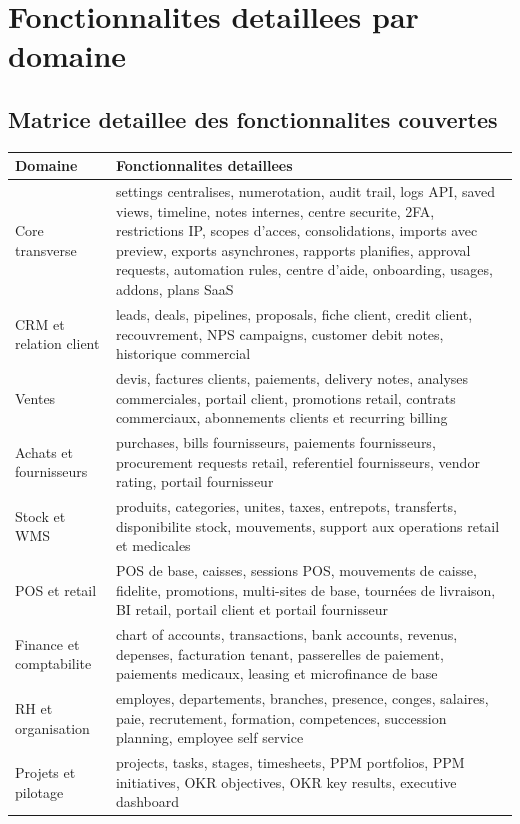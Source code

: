 \documentclass[11pt,a4paper]{article}
\begin{document}
\section{Fonctionnalites detaillees par domaine}
\subsection{Matrice detaillee des fonctionnalites couvertes}
\begin{longtable}{p{3.6cm}p{9.8cm}}
\toprule
\textbf{Domaine} & \textbf{Fonctionnalites detaillees} \\
\midrule
Core transverse & settings centralises, numerotation, audit trail, logs API, saved views, timeline, notes internes, centre securite, 2FA, restrictions IP, scopes d'acces, consolidations, imports avec preview, exports asynchrones, rapports planifies, approval requests, automation rules, centre d'aide, onboarding, usages, addons, plans SaaS \\
CRM et relation client & leads, deals, pipelines, proposals, fiche client, credit client, recouvrement, NPS campaigns, customer debit notes, historique commercial \\
Ventes & devis, factures clients, paiements, delivery notes, analyses commerciales, portail client, promotions retail, contrats commerciaux, abonnements clients et recurring billing \\
Achats et fournisseurs & purchases, bills fournisseurs, paiements fournisseurs, procurement requests retail, referentiel fournisseurs, vendor rating, portail fournisseur \\
Stock et WMS & produits, categories, unites, taxes, entrepots, transferts, disponibilite stock, mouvements, support aux operations retail et medicales \\
POS et retail & POS de base, caisses, sessions POS, mouvements de caisse, fidelite, promotions, multi-sites de base, tournées de livraison, BI retail, portail client et portail fournisseur \\
Finance et comptabilite & chart of accounts, transactions, bank accounts, revenus, depenses, facturation tenant, passerelles de paiement, paiements medicaux, leasing et microfinance de base \\
RH et organisation & employes, departements, branches, presence, conges, salaires, paie, recrutement, formation, competences, succession planning, employee self service \\
Projets et pilotage & projects, tasks, stages, timesheets, PPM portfolios, PPM initiatives, OKR objectives, OKR key results, executive dashboard \\

\end{longtable}
\end{document}
